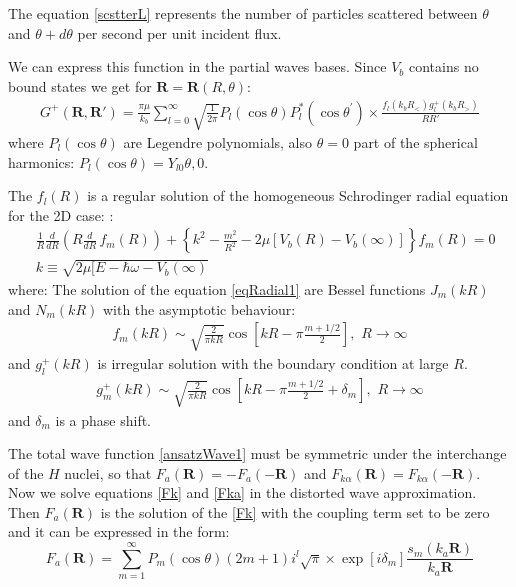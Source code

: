 The equation \eqref{scstterL} represents the number of particles scattered between $ \theta $ and $ \theta + d\theta $ per second per unit incident flux.

We can express this function in the partial waves bases. Since $ V_b $ contains no bound states we get for $ \mathbf{R} = \mathbf{R}(R,\theta) $:
\begin{equation}\label{GreenFka2}
\begin{split}
G^{+}(\mathbf{R}, \mathbf{R}') =  \frac{\pi\mu}{k_b}\sum_{l=0}^{\infty}{\sqrt{\frac{1}{2\pi}} P_l(\cos\theta) P_l^{*}(\cos\theta^{'})}\times \frac{f_l(k_bR_{<})g^{+}_l(k_bR_{>})}{RR'}
\end{split}
\end{equation}
where $ P_l(\cos\theta) $ are Legendre polynomials, also $ \theta = 0 $ part of the spherical harmonics:  $ P_l(\cos\theta) = Y_{l0}{\theta,0} $. 

The $ f_l(R) $ is a regular solution of the homogeneous Schrodinger radial  equation for the 2D case: \cite{H2atom}:
\begin{equation}\label{eqRadial1}
\begin{split}
  & \frac{1}{R}\frac{d}{dR}\left(R \frac{d}{dR}\,f_m(R)\right) + \left\{k^2 - \frac{m^2}{R^2} - 2\mu\left[V_b(R) - V_b(\infty)\right] \right\}f_m(R) = 0 \\[.8em]
& k \equiv \sqrt{2\mu[E - \hbar\omega - V_b(\infty)}
\end{split}
\end{equation}
where:
The solution of the equation \eqref{eqRadial1} are Bessel functions $ J_m(kR) $ and $ N_m(kR) $ with the asymptotic behaviour:
\begin{equation}
\begin{split}
f_{m}(kR)\sim \sqrt{\frac{2}{\pi kR}}\cos\left[kR - \pi\frac{m+1/2}{2} \right],\,\,{R \rightarrow \infty}
\end{split}
\end{equation}
and $ g^{+}_l(kR) $ is irregular solution with the boundary condition at large $ R $.
\begin{equation}\label{remoteWave}
\begin{split}
g^{+}_{m}{(kR)} \sim \sqrt{\frac{2}{\pi kR}}\cos\left[kR - \pi\frac{m+1/2}{2} + \delta_m\right],\,\,{R \rightarrow \infty}
\end{split}
\end{equation}
and $  \delta_m $ is a phase shift. 

The total wave function \eqref{ansatzWave1} must be symmetric under the interchange of the $ H $ nuclei, so that $ F_a(\mathbf{R}) = -F_a(-\mathbf{R}) $ and $ F_{k\alpha}(\mathbf{R}) =  F_{k\alpha}(-\mathbf{R}) $. Now we solve equations \eqref{Fk} and \eqref{Fka} in the distorted wave approximation. Then $ F_a(\mathbf{R}) $ is the solution of the \eqref{Fk} with the coupling term set to be zero and it can be expressed in the form:
\begin{equation}\label{Flong1}
F_a(\mathbf{R}) = \sum_{m=1}^{\infty}{P_m(\cos\theta)(2m+1)i^{l}\sqrt{\pi}\times \exp[i\delta_m]\frac{s_m(k_a\mathbf{R})}{k_a\mathbf{R} } } 
\end{equation}

